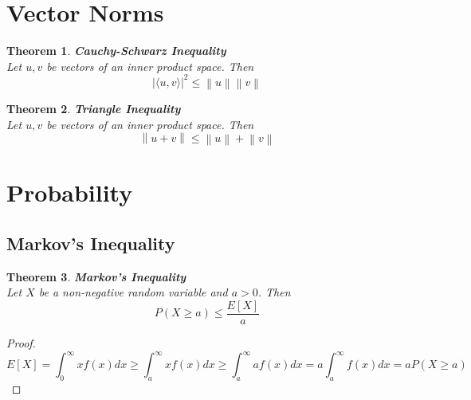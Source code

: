 \documentclass[11pt]{book} %
\newtheorem{theorem}{Theorem}[section]
\begin{document}
\section{Vector Norms}

\begin{theorem}{\textbf{Cauchy-Schwarz Inequality}} \\
    Let $u, v$ be vectors of an inner product space. Then
    \begin{equation*}
        \left| \langle u, v \rangle \right|^2 \leq \left\| u \right\| \left\| v \right\|
    \end{equation*}
\end{theorem} 

\begin{theorem}{\textbf{Triangle Inequality}} \\
    Let $u, v$ be vectors of an inner product space. Then
    \begin{equation*}
        \left\| u + v \right\| \leq \left\| u \right\| + \left\| v \right\|
    \end{equation*}
\end{theorem}


\section{Probability}

\subsection{Markov's Inequality}

\begin{boxA}
    \begin{theorem}{\textbf{Markov's Inequality}} \\
        Let $X$ be a non-negative random variable and $a > 0$. Then
        \begin{equation*}
            P(X \geq a) \leq \frac{E[X]}{a}
        \end{equation*}
    \end{theorem}
\end{boxA}

\begin{proof}
    \begin{equation}
        E[X] = \int_{0}^{\infty} x f(x) dx \geq \int_{a}^{\infty} x f(x) dx \geq \int_{a}^{\infty} a f(x) dx = a \int_{a}^{\infty} f(x) dx = a P(X \geq a)
    \end{equation}
\end{proof}
\end{document}
